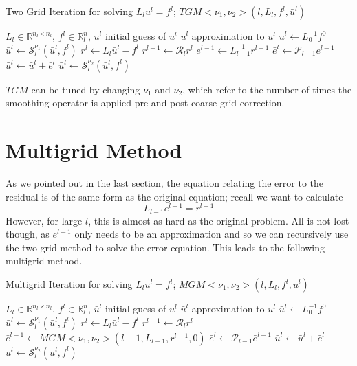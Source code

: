 \documentclass[a4paper,10pt,oneside]{book}
\theoremstyle{plain}%
\theoremstyle{definition}
\theoremstyle{remark}
\newcommand{\bbR}{\mathbb{R}}
\newcommand{\calS}{\mathcal{S}}
\newcommand{\calR}{\mathcal{R}}
\newcommand{\calP}{\mathcal{P}}
\newcommand{\Omegal}{\Omega_l} %
\newcommand{\nl}{n_l} %
\newcommand{\fl}{f^l}
\newcommand{\ul}{u^l}
\newcommand{\bul}{\bar{u}^l}
\newcommand{\Ll}{L_l}
\begin{document}
\begin{algorithm}
 \caption{Two Grid Iteration for solving $\Ll\ul=\fl$;
$TGM<\nu_1,\nu_2>(l,\Ll,\fl,\bul)$}
 \begin{algorithmic}
  \REQUIRE $\Ll\in\bbR^{\nl\times \nl}$, $\fl\in\bbR^\nl$, $\bul$ initial guess
           of $\ul$
  \ENSURE $\bul$ approximation to $\ul$
   \STATE $\bul \gets L_0^{-1}f^0$
  \ELSE
   \STATE $\bul \gets \calS_l^{\nu_1}(\bul, \fl)$ 
   \STATE $r^l \gets \Ll\bul-\fl$
   \STATE $r^{l-1} \gets \calR_lr^l$
   \STATE $e^{l-1} \gets L_{l-1}^{-1}r^{l-1}$
   \STATE $\bar{e}^l \gets \calP_{l-1}e^{l-1}$
   \STATE $\bul \gets \bul + \bar{e}^l$           
   \STATE $\bul \gets \calS_l^{\nu_2}(\bul, \fl)$ 
  \ENDIF
 \end{algorithmic}
\end{algorithm}

$TGM$ can be tuned by changing $\nu_1$ and $\nu_2$, which refer to the number
of times the smoothing operator is applied pre and post coarse grid correction.

\section{Multigrid Method}
As we pointed out in the last section, the equation relating the error to the
residual is of the same form as the original equation; recall we want to
calculate
\begin{equation}
 L_{l-1}e^{l-1}=r^{l-1}
\end{equation}
However, for large $l$, this is almost as hard as the original problem. All is 
not lost though, as $e^{l-1}$ only needs to be an approximation and so we can
recursively use the two grid method to solve the error equation. This leads to
the following multigrid method.
\begin{algorithm}
 \caption{Multigrid Iteration for solving $\Ll\ul=\fl$;
$MGM<\nu_1,\nu_2>(l,\Ll,\fl,\bul)$}
 \begin{algorithmic}
  \REQUIRE $\Ll\in\bbR^{\nl\times\nl}$, $\fl\in\bbR^\nl$, $\bul$
           initial guess of $\ul$
  \ENSURE $\bul$ approximation to $\ul$
   \STATE $\bul \gets L_0^{-1}f^0$
  \ELSE
   \STATE $\bul \gets \calS_l^{\nu_1}(\bul, \fl)$ 
   \STATE $r^l \gets \Ll\bul-\fl$
   \STATE $r^{l-1} \gets \calR_lr^l$
   \STATE $\bar{e}^{l-1} \gets MGM<\nu_1,\nu_2>(l-1, L_{l-1}, r^{l-1}, 0)$
   \STATE $\bar{e}^l \gets \calP_{l-1}\bar{e}^{l-1}$
   \STATE $\bul \gets \bul + \bar{e}^l$           
   \STATE $\bul \gets \calS_l^{\nu_2}(\bul, \fl)$ 
  \ENDIF
 \end{algorithmic}
\end{algorithm}
\end{document}
